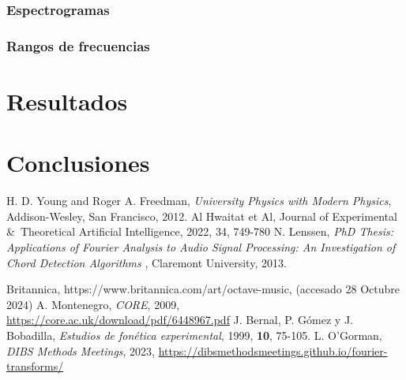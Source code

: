 \documentclass[12pt, letterpaper]{article}
\begin{document}
\subsubsection{Espectrogramas}



\subsubsection{Rangos de frecuencias}

\section{Resultados}

\section{Conclusiones}



\begin{thebibliography}{9}
  H. D. Young and Roger A. Freedman, \emph{University Physics with Modern Physics}, 
  Addison-Wesley, San Francisco, 2012. %
  Al Hwaitat et Al, Journal of Experimental \&\ Theoretical Artificial Intelligence,
  2022, 34, 749-780
  N. Lenssen, \emph{PhD Thesis: Applications of Fourier Analysis to Audio Signal Processing: An Investigation of Chord Detection Algorithms
  }, Claremont University, 2013.

  Britannica, https://www.britannica.com/art/octave-music, (accesado 28 Octubre 2024)
  A. Montenegro, \textit{CORE}, 2009, \url{https://core.ac.uk/download/pdf/6448967.pdf}
  J. Bernal, P. Gómez y J. Bobadilla, \textit{Estudios de fonética experimental}, 1999, \textbf{10}, 75-105.
  L. O'Gorman, \textit{DIBS Methods Meetings}, 2023, \url{https://dibsmethodsmeetings.github.io/fourier-transforms/}
\end{thebibliography}
\end{document}
